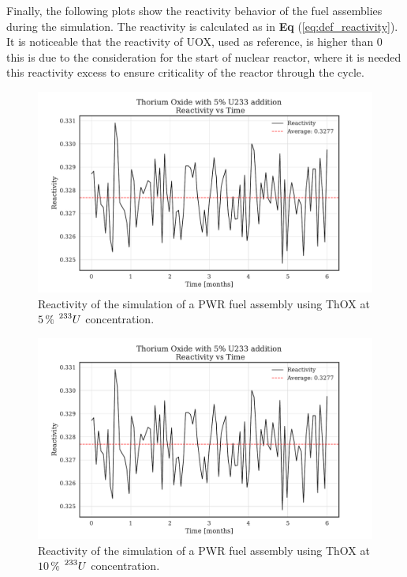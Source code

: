 Finally, the following plots show the reactivity behavior of the fuel assemblies during the simulation. The reactivity is calculated as in \textbf{Eq} (\ref{eq:def_reactivity}). It is noticeable that the reactivity of UOX, used as reference, is higher than \(0\) this is due to the consideration for the start of nuclear reactor, where it is needed this reactivity excess to ensure criticality of the reactor through the cycle.

\begin{figure}
    \centering
    \includegraphics[width=1\textwidth, scale=0.5]{Kap7/Figures_Kap7/Reactivity_vs_Time_ThOX_U233_5.pdf}
    \caption{Reactivity of the simulation of a PWR fuel assembly using ThOX at \(5 \, \%\) \(\prescript{233}{}{U}\) concentration.}
    \label{fig:reactivity_th_u233_5}
\end{figure}

\begin{figure}
    \centering
    \includegraphics[width=1\textwidth, scale=0.5]{Kap7/Figures_Kap7/Reactivity_vs_Time_ThOX_U233_5.pdf}
    \caption{Reactivity of the simulation of a PWR fuel assembly using ThOX at \(10 \, \%\) \(\prescript{233}{}{U}\) concentration.}
    \label{fig:reactivity_th_u233_10}   
\end{figure}

